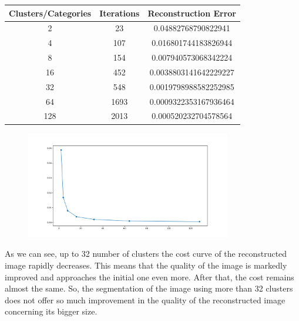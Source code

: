 \documentclass[11pt]{article}
\begin{document}
\begin{center}
 \begin{tabular}{||c c c||} 
 
 \hline
 Clusters/Categories & Iterations & Reconstruction Error \\ [1ex] 
 \hline\hline
 2 & 23 & 0.04882768790822941 \\ [1ex]
 \hline 
 4 & 107 & 0.016801744183826944  \\ [1ex]
 \hline
 8 & 154 & 0.007940573068342224 \\ [1ex]
 \hline
 16 & 452 & 0.0038803141642229227 \\[1ex]
 \hline
 32 & 548 & 0.0019798988582252985 \\ [1ex]
 \hline
 64 & 1693 & 0.0009322353167936464 \\ [1ex]
 \hline
 128 & 2013 & 0.000520232704578564 \\ [1ex] 
 \hline
\end{tabular}
\end{center}


     \begin{figure}[H]
		\centering
		\includegraphics[width=0.8\textwidth]{./Project_2_files/cost_curve.png}
	\end{figure}

As we can see, up to 32 number of clusters the cost curve of the reconstructed image rapidly decreases. This means that the quality of the image is markedly improved and    approaches the initial one even more. After that, the cost remains almost the same. So, the segmentation of the image using more than 32 clusters does not offer so much improvement in the quality of the reconstructed image concerning its bigger size.

\newpage
\nocite{*}



\underline{}

 
\end{document}
